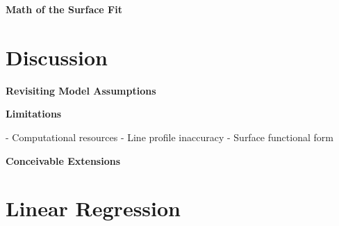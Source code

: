 \documentclass[twocolumn]{aastex631}
\begin{document}
\begin{mdframed}
    \textbf{Math of the Surface Fit}

    \textcolor{lightgray}{\blindtext}
\end{mdframed}


\section{Discussion}
\begin{mdframed}
    \textbf{Revisiting Model Assumptions}

   \textcolor{lightgray}{\blindtext}
\end{mdframed}

\begin{mdframed}
    \textbf{Limitations}

    - Computational resources
    - Line profile inaccuracy
    - Surface functional form
    
    \textcolor{lightgray}{\blindtext}
\end{mdframed}


\begin{mdframed}
    \textbf{Conceivable Extensions}

    \textcolor{lightgray}{\blindtext}
\end{mdframed}


\pagebreak
\newpage

\begin{acknowledgments}
    \blindtext
\end{acknowledgments}


\software{}


\clearpage

\appendix
\section{Linear Regression}
\blindtext
\end{document}
